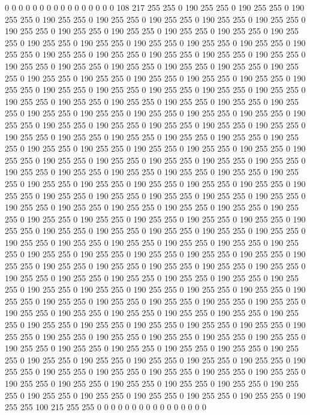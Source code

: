 0 0 0 0 0 0 0 0 0 0 0 0 0 0 0 0 108 217 255 255 0 190 255 255 0 190 255 255 0 190 255 255 0 190 255 255 0 190 255 255 0 190 255 255 0 190 255 255 0 190 255 255 0 190 255 255 0 190 255 255 0 190 255 255 0 190 255 255 0 190 255 255 0 190 255 255 0 190 255 255 0 190 255 255 0 190 255 255 0 190 255 255 0 190 255 255 0 190 255 255 0 190 255 255 0 190 255 255 0 190 255 255 0 190 255 255 0 190 255 255 0 190 255 255 0 190 255 255 0 190 255 255 0 190 255 255 0 190 255 255 0 190 255 255 0 190 255 255 0 190 255 255 0 190 255 255 0 190 255 255 0 190 255 255 0 190 255 255 0 190 255 255 0 190 255 255 0 190 255 255 0 190 255 255 0 190 255 255 0 190 255 255 0 190 255 255 0 190 255 255 
0 190 255 255 0 190 255 255 0 190 255 255 0 190 255 255 0 190 255 255 0 190 255 255 0 190 255 255 0 190 255 255 0 190 255 255 0 190 255 255 0 190 255 255 0 190 255 255 0 190 255 255 0 190 255 255 0 190 255 255 0 190 255 255 0 190 255 255 0 190 255 255 0 190 255 255 0 190 255 255 0 190 255 255 0 190 255 255 0 190 255 255 0 190 255 255 0 190 255 255 0 190 255 255 0 190 255 255 0 190 255 255 0 190 255 255 0 190 255 255 0 190 255 255 0 190 255 255 0 190 255 255 0 190 255 255 0 190 255 255 0 190 255 255 0 190 255 255 0 190 255 255 0 190 255 255 0 190 255 255 0 190 255 255 0 190 255 255 0 190 255 255 0 190 255 255 0 190 255 255 0 190 255 255 0 190 255 255 0 190 255 255 0 190 255 255 0 190 255 255 
0 190 255 255 0 190 255 255 0 190 255 255 0 190 255 255 0 190 255 255 0 190 255 255 0 190 255 255 0 190 255 255 0 190 255 255 0 190 255 255 0 190 255 255 0 190 255 255 0 190 255 255 0 190 255 255 0 190 255 255 0 190 255 255 0 190 255 255 0 190 255 255 0 190 255 255 0 190 255 255 0 190 255 255 0 190 255 255 0 190 255 255 0 190 255 255 0 190 255 255 0 190 255 255 0 190 255 255 0 190 255 255 0 190 255 255 0 190 255 255 0 190 255 255 0 190 255 255 0 190 255 255 0 190 255 255 0 190 255 255 0 190 255 255 0 190 255 255 0 190 255 255 0 190 255 255 0 190 255 255 0 190 255 255 0 190 255 255 0 190 255 255 0 190 255 255 0 190 255 255 0 190 255 255 0 190 255 255 0 190 255 255 0 190 255 255 0 190 255 255 
0 190 255 255 0 190 255 255 0 190 255 255 0 190 255 255 0 190 255 255 0 190 255 255 0 190 255 255 0 190 255 255 0 190 255 255 0 190 255 255 0 190 255 255 0 190 255 255 0 190 255 255 0 190 255 255 0 190 255 255 0 190 255 255 0 190 255 255 0 190 255 255 0 190 255 255 0 190 255 255 0 190 255 255 0 190 255 255 0 190 255 255 0 190 255 255 0 190 255 255 0 190 255 255 0 190 255 255 0 190 255 255 0 190 255 255 0 190 255 255 0 190 255 255 0 190 255 255 0 190 255 255 0 190 255 255 0 190 255 255 0 190 255 255 0 190 255 255 0 190 255 255 0 190 255 255 0 190 255 255 0 190 255 255 0 190 255 255 0 190 255 255 0 190 255 255 0 190 255 255 100 215 255 255 0 0 0 0 0 0 0 0 0 0 0 0 0 0 0 0 
